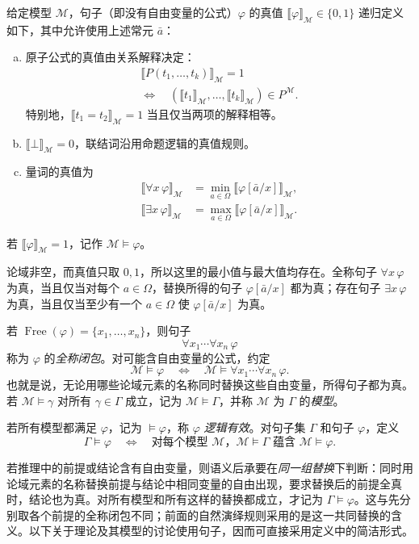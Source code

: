 \documentclass[lang=cn,a4paper,fontset=none,zihao=false,10pt,openany,twoside]{beautybook}
\numberwithin{algorithm}{chapter}
\begin{document}
\begin{definition}[公式的真值]
给定模型 $\mathcal M$，句子（即没有自由变量的公式）$\varphi$ 的真值 $\llbracket\varphi\rrbracket_{\mathcal M}\in\{0,1\}$ 递归定义如下，其中允许使用上述常元 $\bar a$：
\begin{enumerate}[(a)]
\item 原子公式的真值由关系解释决定：
\begin{gather*}
 \llbracket P(t_1,\ldots,t_k)\rrbracket_{\mathcal M}=1\\
 \Longleftrightarrow\quad
 (\llbracket t_1\rrbracket_{\mathcal M},\ldots,
  \llbracket t_k\rrbracket_{\mathcal M})\in P^{\mathcal M}.
\end{gather*}
特别地，$\llbracket t_1=t_2\rrbracket_{\mathcal M}=1$ 当且仅当两项的解释相等。
\item $\llbracket\bot\rrbracket_{\mathcal M}=0$，联结词沿用命题逻辑的真值规则。
\item 量词的真值为
\begin{align*}
 \llbracket\forall x\,\varphi\rrbracket_{\mathcal M}
 &=\min_{a\in\Omega}\llbracket\varphi[\bar a/x]\rrbracket_{\mathcal M},\\
 \llbracket\exists x\,\varphi\rrbracket_{\mathcal M}
 &=\max_{a\in\Omega}\llbracket\varphi[\bar a/x]\rrbracket_{\mathcal M}.
\end{align*}
\end{enumerate}
若 $\llbracket\varphi\rrbracket_{\mathcal M}=1$，记作 $\mathcal M\models\varphi$。
\end{definition}
论域非空，而真值只取 $0,1$，所以这里的最小值与最大值均存在。全称句子 $\forall x\,\varphi$ 为真，当且仅当对每个 $a\in\Omega$，替换所得的句子 $\varphi[\bar a/x]$ 都为真；存在句子 $\exists x\,\varphi$ 为真，当且仅当至少有一个 $a\in\Omega$ 使 $\varphi[\bar a/x]$ 为真。

\begin{definition}[全称闭包与语义后承]
若 $\operatorname{Free}(\varphi)=\{x_1,\ldots,x_n\}$，则句子
\[
 \forall x_1\cdots\forall x_n\,\varphi
\]
称为 $\varphi$ 的\emph{全称闭包}。对可能含自由变量的公式，约定
\[
 \mathcal M\models\varphi
 \quad\Longleftrightarrow\quad
 \mathcal M\models\forall x_1\cdots\forall x_n\,\varphi.
\]
也就是说，无论用哪些论域元素的名称同时替换这些自由变量，所得句子都为真。若 $\mathcal M\models\gamma$ 对所有 $\gamma\in\Gamma$ 成立，记为 $\mathcal M\models\Gamma$，并称 $\mathcal M$ 为 $\Gamma$ 的\emph{模型}。

若所有模型都满足 $\varphi$，记为 $\models\varphi$，称 $\varphi$ \emph{逻辑有效}。对句子集 $\Gamma$ 和句子 $\varphi$，定义
\[
 \Gamma\models\varphi
 \quad\Longleftrightarrow\quad
 \text{对每个模型 $\mathcal M$，$\mathcal M\models\Gamma$ 蕴含
 $\mathcal M\models\varphi$}.
\]
\end{definition}
若推理中的前提或结论含有自由变量，则语义后承要在\emph{同一组替换}下判断：同时用论域元素的名称替换前提与结论中相同变量的自由出现，要求替换后的前提全真时，结论也为真。对所有模型和所有这样的替换都成立，才记为 $\Gamma\models\varphi$。这与先分别取各个前提的全称闭包不同；前面的自然演绎规则采用的是这一共同替换的含义。以下关于理论及其模型的讨论使用句子，因而可直接采用定义中的简洁形式。
\end{document}
